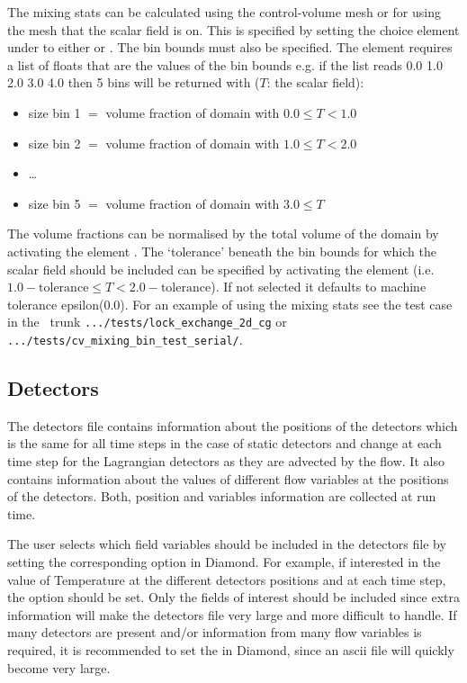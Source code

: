 The mixing stats can be calculated using the control-volume mesh or for \Poo using the mesh that the scalar field is on. This is specified by setting the choice element under  to either  or . The bin bounds must also be specified.  The element  requires a list of floats that are the values of the bin bounds e.g. if the list reads 0.0 1.0 2.0 3.0 4.0 then 5 bins will be returned with ($T$: the scalar field):
\begin{itemize}
\item size bin 1 $=$ volume fraction of domain with $0.0\leq T < 1.0$
\item size bin 2 $=$ volume fraction of domain with $1.0\leq T < 2.0$
\item \ldots 
\item size bin 5 $=$ volume fraction of domain with $3.0\leq T$
\end{itemize}

The volume fractions can be normalised by the total volume of the domain by activating the element . The `tolerance' beneath the bin bounds for which the scalar field should be included can be specified by activating the element  (i.e. $1.0-\mathrm{tolerance} \leq T < 2.0-\mathrm{tolerance}$). If not selected it defaults to machine tolerance epsilon(0.0). For an example of using the mixing stats see the test case in the \fluidity\ trunk \lstinline[language = bash]+.../tests/lock_exchange_2d_cg+ or \lstinline[language = bash]+.../tests/cv_mixing_bin_test_serial/+.

\subsection{Detectors}
\label{sect:diagnostics_detectors}
The detectors file contains information about the positions of the detectors which is the same for all time steps in the case of static detectors and change at each time step for the Lagrangian detectors as they are advected by the flow. It also contains information about the values of different flow variables at the positions of the detectors. Both, position and variables information are collected at run time.

The user selects which field variables should be included in the detectors file by setting the corresponding option in Diamond. For example, if interested in the value of Temperature at the different detectors positions and at each time step, the option   should be set. Only the fields of interest should be included since extra information will make the detectors file very large and more difficult to handle. If many detectors are present and/or information from many flow variables is required, it is recommended to set the  in Diamond, since an ascii file will quickly become very large.

